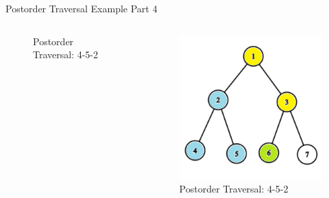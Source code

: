 \documentclass[aspectratio=169]{beamer}%
\begin{document}
\begin{frame}{Postorder Traversal Example Part 4}
\begin{columns}
\begin{column}{0.32\textwidth}
\begin{figure}
                \caption{Postorder Traversal: 4-5-2}
            \end{figure}
        \end{column}
        \hfill
        \begin{column}{0.32\textwidth}
            \begin{figure}
                \centering
                \includegraphics[width = .9\linewidth]{tree-post 12.png}
                \caption{Postorder Traversal: 4-5-2}
            \end{figure}
        \end{column}
    \end{columns}
\end{frame}
\end{document}
